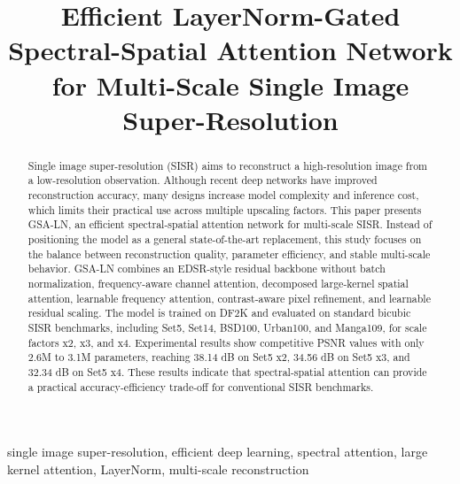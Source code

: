 \documentclass[conference]{IEEEtran}
\begin{document}
\title{Efficient LayerNorm-Gated Spectral-Spatial Attention Network for Multi-Scale Single Image Super-Resolution}

\author{
\and
{}
}

\maketitle

\begin{abstract}
Single image super-resolution (SISR) aims to reconstruct a high-resolution image from a low-resolution observation. Although recent deep networks have improved reconstruction accuracy, many designs increase model complexity and inference cost, which limits their practical use across multiple upscaling factors. This paper presents GSA-LN, an efficient spectral-spatial attention network for multi-scale SISR. Instead of positioning the model as a general state-of-the-art replacement, this study focuses on the balance between reconstruction quality, parameter efficiency, and stable multi-scale behavior. GSA-LN combines an EDSR-style residual backbone without batch normalization, frequency-aware channel attention, decomposed large-kernel spatial attention, learnable frequency attention, contrast-aware pixel refinement, and learnable residual scaling. The model is trained on DF2K and evaluated on standard bicubic SISR benchmarks, including Set5, Set14, BSD100, Urban100, and Manga109, for scale factors x2, x3, and x4. Experimental results show competitive PSNR values with only 2.6M to 3.1M parameters, reaching 38.14 dB on Set5 x2, 34.56 dB on Set5 x3, and 32.34 dB on Set5 x4. These results indicate that spectral-spatial attention can provide a practical accuracy-efficiency trade-off for conventional SISR benchmarks.
\end{abstract}

\begin{IEEEkeywords}
single image super-resolution, efficient deep learning, spectral attention, large kernel attention, LayerNorm, multi-scale reconstruction
\end{IEEEkeywords}
\end{document}
